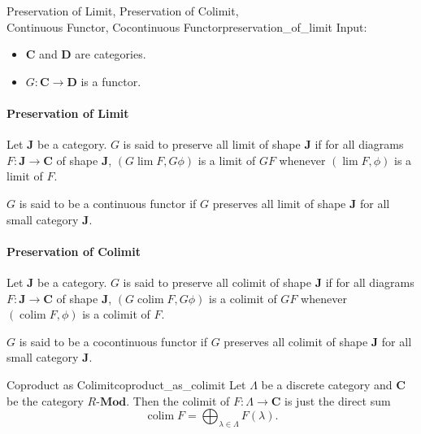 \documentclass{article}
\begin{document}
\begin{definition}{Preservation of Limit, Preservation of Colimit, \\ Continuous Functor, Cocontinuous Functor}{preservation_of_limit}
    Input:
    \begin{itemize}
        \item $\mathbf{C}$ and $\mathbf{D}$ are categories.
        \item $G:\mathbf{C}\rightarrow \mathbf{D}$ is a functor.
    \end{itemize}
    \paragraph*{Preservation of Limit}
    Let $\mathbf{J}$ be a category.
    $G$ is said to preserve all limit of shape $\mathbf{J}$ if for all diagrams $F:\mathbf{J}\rightarrow \mathbf{C}$ of shape $\mathbf{J}$, $(G\lim F, G\phi)$ is a limit of $GF$ whenever $(\lim F, \phi)$ is a limit of $F$.
    \par
    $G$ is said to be a continuous functor if $G$ preserves all limit of shape $\mathbf{J}$ for all small category $\mathbf{J}$.
    \tcblower
    \paragraph*{Preservation of Colimit}
    Let $\mathbf{J}$ be a category.
    $G$ is said to preserve all colimit of shape $\mathbf{J}$ if for all diagrams $F:\mathbf{J}\rightarrow \mathbf{C}$ of shape $\mathbf{J}$, $(G\operatorname{colim} F, G\phi)$ is a colimit of $GF$ whenever $(\operatorname{colim} F, \phi)$ is a colimit of $F$.
    \par
    $G$ is said to be a cocontinuous functor if $G$ preserves all colimit of shape $\mathbf{J}$ for all small category $\mathbf{J}$.
\end{definition}

\begin{example}{Coproduct as Colimit}{coproduct_as_colimit}
    Let $\Lambda$ be a discrete category and $\mathbf{C}$ be the category $R$-$\mathbf{Mod}$. 
    Then the colimit of $F:\Lambda\rightarrow \mathbf{C}$ is just the direct sum
    \[ \operatorname*{colim} F = \bigoplus_{\lambda\in\Lambda} F(\lambda). \]
\end{example}
\end{document}
